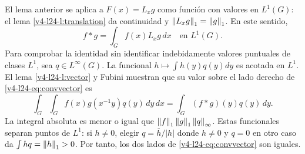 \begin{observacion}\label{v4-l24-o:convvector}
El lema anterior se aplica a $F(x)=L_xg$ como función con valores en $L^1(G)$: el lema \ref{v4-l24-l:translation} da continuidad y $\left\lVert L_xg\right\rVert_1=\left\lVert g\right\rVert_1$. En este sentido,
\begin{equation}\label{v4-l24-eq:convvector}
f*g=\int_Gf(x)L_xg\,dx\quad\text{en }L^1(G).
\end{equation}
Para comprobar la identidad sin identificar indebidamente valores puntuales de clases $L^1$, sea $q\in L^\infty(G)$. La funcional $h\mapsto\int h(y)q(y)dy$ es acotada en $L^1$. El lema \ref{v4-l24-l:vector} y Fubini muestran que su valor sobre el lado derecho de \eqref{v4-l24-eq:convvector} es
\[
\int_G\int_G f(x)g(x^{-1}y)q(y)\,dy\,dx
=\int_G(f*g)(y)q(y)\,dy.
\]
La integral absoluta es menor o igual que $\left\lVert f\right\rVert_1\left\lVert g\right\rVert_1\left\lVert q\right\rVert_\infty$. Estas funcionales separan puntos de $L^1$: si $h\ne0$, elegir $q=\overline h/|h|$ donde $h\ne0$ y $q=0$ en otro caso da $\int hq=\left\lVert h\right\rVert_1>0$. Por tanto, los dos lados de \eqref{v4-l24-eq:convvector} son iguales.
\end{observacion}

